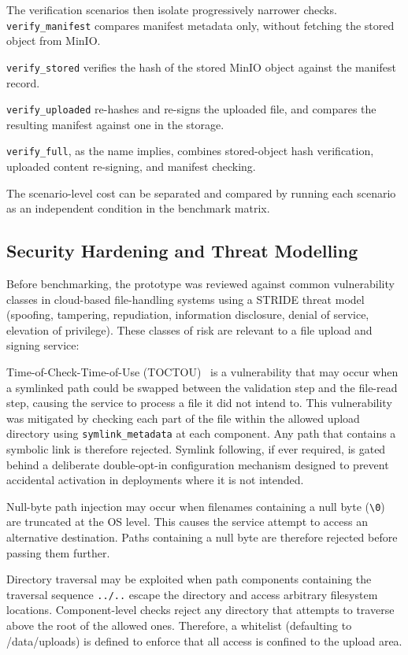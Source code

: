 \documentclass[12pt,a4paper]{article}
\begin{document}
The verification scenarios then isolate progressively narrower checks. \texttt{verify\_manifest} compares manifest metadata only, without fetching the stored object from MinIO. 

\texttt{verify\_stored} verifies the hash of the stored MinIO object against the manifest record. 

\texttt{verify\_uploaded} re-hashes and re-signs the uploaded file, and compares the resulting manifest against one in the storage.  

\texttt{verify\_full}, as the name implies, combines stored-object hash verification, uploaded content re-signing, and manifest checking.

The scenario-level cost can be separated and compared by running each scenario as an independent condition in the benchmark matrix.

\subsection{Security Hardening and Threat Modelling}

Before benchmarking, the prototype was reviewed against common vulnerability classes in cloud-based file-handling systems using a STRIDE threat model~\cite{shostack2014threat} (spoofing, tampering, repudiation, information disclosure, denial of service, elevation of privilege). These classes of risk are relevant to a file upload and signing service:

Time-of-Check-Time-of-Use (TOCTOU)~\cite{bishop1996toctou} is a vulnerability that may occur when a symlinked path could be swapped between the validation step and the file-read step, causing the service to process a file it did not intend to. This vulnerability was mitigated by checking each part of the file within the allowed upload directory using \texttt{symlink\_metadata} at each component. Any path that contains a symbolic link is therefore rejected. Symlink following, if ever required, is gated behind a deliberate double-opt-in configuration mechanism designed to prevent accidental activation in deployments where it is not intended.

Null-byte path injection may occur when filenames containing a null byte (\texttt{\textbackslash0}) are truncated at the OS level. This causes the service attempt to access an alternative destination. Paths containing a null byte are therefore rejected before passing them further.

Directory traversal may be exploited when path components containing the traversal sequence \texttt{../..} escape the directory and access arbitrary filesystem locations. Component-level checks reject any directory that attempts to traverse above the root of the allowed ones. Therefore, a whitelist (defaulting to /data/uploads) is defined to enforce that all access is confined to the upload area.
\end{document}
